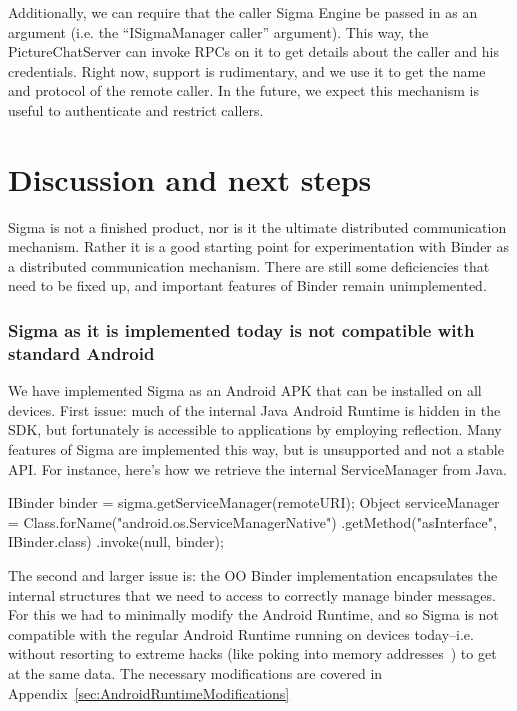 \documentclass[prodmode]{acmlarge}
\begin{document}
Additionally, we can require that the caller Sigma Engine be passed in as an argument (i.e. the ``ISigmaManager caller'' argument). This way, the PictureChatServer can invoke RPCs on it to get details about the caller and his credentials. Right now, support is rudimentary, and we use it to get the name and protocol of the remote caller. In the future, we expect this mechanism is useful to authenticate and restrict callers.

\section{Discussion and next steps}
\label{sec:Discussion}
Sigma is not a finished product, nor is it the ultimate distributed communication mechanism. Rather it is a good starting point for experimentation with Binder as a distributed communication mechanism. There are still some deficiencies that need to be fixed up, and important features of Binder remain unimplemented.

\subsubsection{Sigma as it is implemented today is not compatible with standard Android}
We have implemented Sigma as an Android APK that can be installed on all devices. First issue: much of the internal Java Android Runtime is hidden in the SDK, but fortunately is accessible to applications by employing reflection. Many features of Sigma are implemented this way, but is unsupported and not a stable API. For instance, here's how we retrieve the internal ServiceManager from Java.

\begin{snippet}
IBinder binder = sigma.getServiceManager(remoteURI);
Object serviceManager = Class.forName("android.os.ServiceManagerNative")
                    .getMethod("asInterface", IBinder.class)
                    .invoke(null, binder);
\end{snippet}

The second and larger issue is: the OO Binder implementation encapsulates the internal structures that we need to access to correctly manage binder messages. For this we had to minimally modify the Android Runtime, and so Sigma is not compatible with the regular Android Runtime running on devices today--i.e. without resorting to extreme hacks (like poking into memory addresses~\cite{FacebookDalvikHacks}) to get at the same data. The necessary modifications are covered in Appendix~\ref{sec:AndroidRuntimeModifications}
\end{document}
